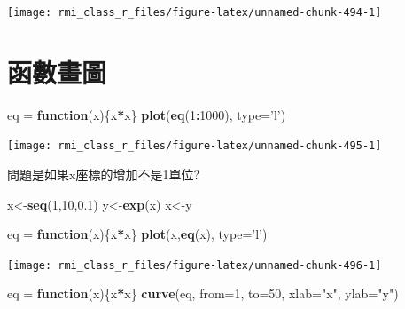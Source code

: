 \documentclass[]{book}
\newenvironment{Shaded}{\begin{snugshade}}{\end{snugshade}}
\newcommand{\ControlFlowTok}[1]{\textcolor[rgb]{0.13,0.29,0.53}{\textbf{#1}}}
\newcommand{\DataTypeTok}[1]{\textcolor[rgb]{0.13,0.29,0.53}{#1}}
\newcommand{\DecValTok}[1]{\textcolor[rgb]{0.00,0.00,0.81}{#1}}
\newcommand{\FloatTok}[1]{\textcolor[rgb]{0.00,0.00,0.81}{#1}}
\newcommand{\KeywordTok}[1]{\textcolor[rgb]{0.13,0.29,0.53}{\textbf{#1}}}
\newcommand{\NormalTok}[1]{#1}
\newcommand{\OperatorTok}[1]{\textcolor[rgb]{0.81,0.36,0.00}{\textbf{#1}}}
\newcommand{\StringTok}[1]{\textcolor[rgb]{0.31,0.60,0.02}{#1}}
\theoremstyle{definition}
\theoremstyle{definition}
\theoremstyle{definition}
\theoremstyle{remark}
\begin{document}
\begin{center}\texttt{[image: rmi\_class\_r\_files/figure-latex/unnamed-chunk-494-1]} \end{center}

\section{函數畫圖}

\begin{Shaded}
\begin{Highlighting}[]
\NormalTok{eq =}\StringTok{ }\ControlFlowTok{function}\NormalTok{(x)\{x}\OperatorTok{*}\NormalTok{x\}}
\KeywordTok{plot}\NormalTok{(}\KeywordTok{eq}\NormalTok{(}\DecValTok{1}\OperatorTok{:}\DecValTok{1000}\NormalTok{), }\DataTypeTok{type=}\StringTok{'l'}\NormalTok{)}
\end{Highlighting}
\end{Shaded}

\begin{center}\texttt{[image: rmi\_class\_r\_files/figure-latex/unnamed-chunk-495-1]} \end{center}

問題是如果x座標的增加不是1單位?

\begin{Shaded}
\begin{Highlighting}[]
\NormalTok{x<-}\KeywordTok{seq}\NormalTok{(}\DecValTok{1}\NormalTok{,}\DecValTok{10}\NormalTok{,}\FloatTok{0.1}\NormalTok{)}
\NormalTok{y<-}\KeywordTok{exp}\NormalTok{(x)}
\NormalTok{x<-y}

\NormalTok{eq =}\StringTok{ }\ControlFlowTok{function}\NormalTok{(x)\{x}\OperatorTok{*}\NormalTok{x\}}
\KeywordTok{plot}\NormalTok{(x,}\KeywordTok{eq}\NormalTok{(x), }\DataTypeTok{type=}\StringTok{'l'}\NormalTok{)}
\end{Highlighting}
\end{Shaded}

\begin{center}\texttt{[image: rmi\_class\_r\_files/figure-latex/unnamed-chunk-496-1]} \end{center}

\begin{Shaded}
\begin{Highlighting}[]
\NormalTok{eq =}\StringTok{ }\ControlFlowTok{function}\NormalTok{(x)\{x}\OperatorTok{*}\NormalTok{x\}}
\KeywordTok{curve}\NormalTok{(eq, }\DataTypeTok{from=}\DecValTok{1}\NormalTok{, }\DataTypeTok{to=}\DecValTok{50}\NormalTok{, }\DataTypeTok{xlab=}\StringTok{"x"}\NormalTok{, }\DataTypeTok{ylab=}\StringTok{"y"}\NormalTok{)}
\end{Highlighting}
\end{Shaded}
\end{document}
